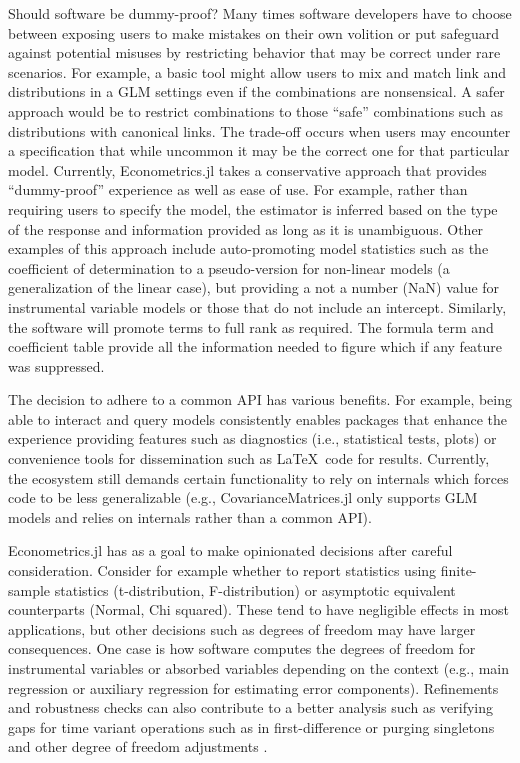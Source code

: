 \documentclass{juliacon}
\begin{document}
Should software be dummy-proof? Many times software developers have to choose between exposing users to make mistakes on their own volition or put safeguard against potential misuses by restricting behavior that may be correct under rare scenarios. For example, a basic tool might allow users to mix and match link and distributions in a GLM settings even if the combinations are nonsensical. A safer approach would be to restrict combinations to those ``safe'' combinations such as distributions with canonical links. The trade-off occurs when users may encounter a specification that while uncommon it may be the correct one for that particular model. Currently, Econometrics.jl takes a conservative approach that provides ``dummy-proof'' experience as well as ease of use. For example, rather than requiring users to specify the model, the estimator is inferred based on the type of the response and information provided as long as it is unambiguous. Other examples of this approach include auto-promoting model statistics such as the coefficient of determination to a pseudo-version for non-linear models (a generalization of the linear case), but providing a not a number (NaN) value for instrumental variable models or those that do not include an intercept. Similarly, the software will promote terms to full rank as required. The formula term and coefficient table provide all the information needed to figure which if any feature was suppressed.

The decision to adhere to a common API has various benefits. For example, being able to interact and query models consistently enables packages that enhance the experience providing features such as diagnostics (i.e., statistical tests, plots) or convenience tools for dissemination such as \LaTeX\ code for results. Currently, the ecosystem still demands certain functionality to rely on internals which forces code to be less generalizable (e.g., CovarianceMatrices.jl only supports GLM models and relies on internals rather than a common API).

Econometrics.jl has as a goal to make opinionated decisions after careful consideration. Consider for example whether to report statistics using finite-sample statistics (t-distribution, F-distribution) or asymptotic equivalent counterparts (Normal, Chi squared). These tend to have negligible effects in most applications, but other decisions such as degrees of freedom may have larger consequences. One case is how software computes the degrees of freedom for instrumental variables or absorbed variables depending on the context (e.g., main regression or auxiliary regression for estimating error components). Refinements and robustness checks can also contribute to a better analysis such as verifying gaps for time variant operations such as in first-difference or purging singletons and other degree of freedom adjustments \cite{Singletons}.
\end{document}
